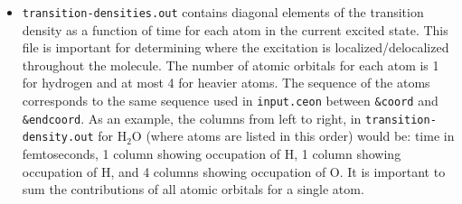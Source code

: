\documentclass[letterpaper,12pt,titlepage]{article}
\begin{document}
\begin{itemize}
\item \verb+transition-densities.out+ contains diagonal elements of the transition density as a function of time for each atom in the current excited state.  This file is important for determining where the excitation is localized/delocalized throughout the molecule.  The number of atomic orbitals for each atom is 1 for hydrogen and at most 4 for heavier atoms.  The sequence of the atoms corresponds to the same sequence used in \verb+input.ceon+ between \verb+&coord+ and \verb+&endcoord+.  As an example, the columns from left to right, in \verb+transition-density.out+ for H$_{2}$O (where atoms are listed in this order) would be: time in femtoseconds, 1 column showing occupation of H, 1 column showing occupation of H, and 4 columns showing occupation of O.  It is important to sum the contributions of all atomic orbitals for a single atom.
\end{itemize}

\newpage


\end{document}
